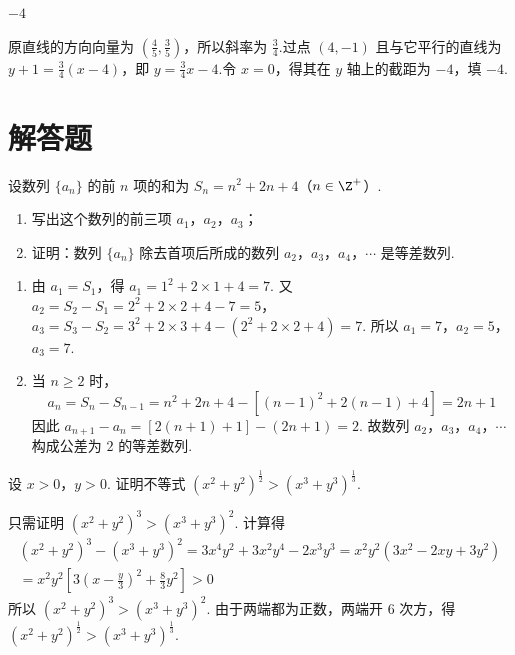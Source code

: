 \begin{answer}
\(-4\)
\end{answer}

\begin{solution}
原直线的方向向量为 \(\left(\frac{4}{5},\frac{3}{5}\right)\)，所以斜率为 \(\frac{3}{4}\).过点 \((4,-1)\) 且与它平行的直线为
\(y+1=\frac{3}{4}(x-4)\)，即 \(y=\frac{3}{4}x-4\).令 \(x=0\)，得其在 \(y\) 轴上的截距为 \(-4\)，填 \(-4\).
\end{solution}

\section{解答题}

\begin{problem}

设数列 \(\{a_n\}\) 的前 \(n\) 项的和为 \(S_n=n^2+2n+4\)（\(n\in\Z^+\)）.

\begin{enumerate}
\item 写出这个数列的前三项 \(a_1\)，\(a_2\)，\(a_3\)；
\item 证明：数列 \(\{a_n\}\) 除去首项后所成的数列 \(a_2\)，\(a_3\)，\(a_4\)，\(\cdots\) 是等差数列.
\end{enumerate}
\end{problem}

\begin{solution}
\begin{enumerate}
\item 由 \(a_1=S_1\)，得 \(a_1=1^2+2\times 1+4=7\).
又 \(a_2=S_2-S_1=2^2+2\times 2+4-7=5\)，\(a_3=S_3-S_2=3^2+2\times 3+4-\left( 2^2+2\times 2+4 \right)=7\).
所以 \(a_1=7\)，\(a_2=5\)，\(a_3=7\).

\item 当 \(n\geqslant 2\) 时，
\[
a_n=S_n-S_{n-1}=n^2+2n+4-\left[ \left( n-1 \right)^2+2\left( n-1 \right)+4 \right]=2n+1
\]
因此 \(a_{n+1}-a_n=\left[ 2\left( n+1 \right)+1 \right]-\left( 2n+1 \right)=2\).
故数列 \(a_2\)，\(a_3\)，\(a_4\)，\(\cdots\) 构成公差为 \(2\) 的等差数列.
\end{enumerate}
\end{solution}

\begin{problem}

设 \(x>0\)，\(y>0\). 证明不等式 \(\left( x^2+y^2 \right)^{\frac{1}{2}}>\left( x^3+y^3 \right)^{\frac{1}{3}}\).
\end{problem}

\begin{solution}
只需证明 \(\left( x^2+y^2 \right)^3>\left( x^3+y^3 \right)^2\). 计算得
\[
\begin{gathered}
\left( x^2+y^2 \right)^3-\left( x^3+y^3 \right)^2
 =3x^4y^2+3x^2y^4-2x^3y^3
 =x^2y^2\left( 3x^2-2xy+3y^2 \right)\\
 =x^2y^2\left[ 3\left( x-\frac{y}{3} \right)^2+\frac{8}{3}y^2 \right]>0
\end{gathered}
\]
所以 \(\left( x^2+y^2 \right)^3>\left( x^3+y^3 \right)^2\). 由于两端都为正数，两端开 \(6\) 次方，得 \(\left( x^2+y^2 \right)^{\frac{1}{2}}>\left( x^3+y^3 \right)^{\frac{1}{3}}\).
\end{solution}

